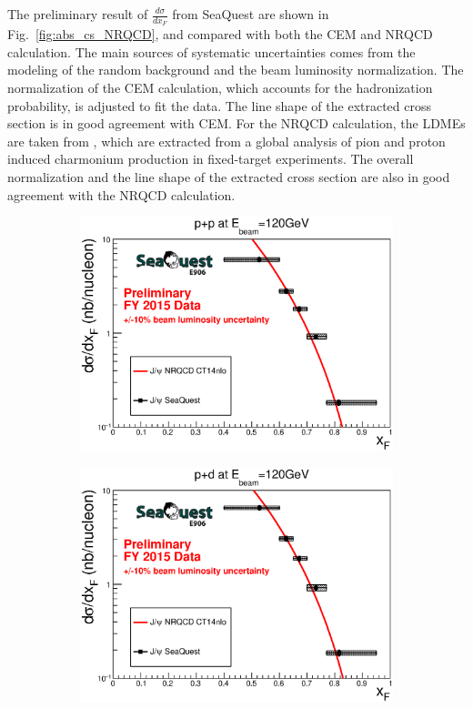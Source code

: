 \documentclass[10pt,a4paper,final]{article}
\begin{document}
The preliminary result of $\frac{d\sigma}{dx_F}$ from SeaQuest are shown in
Fig.~\ref{fig:abs_cs_NRQCD}, and compared with both the CEM and NRQCD calculation.
The main sources of systematic uncertainties comes from the modeling of the random background
and the beam luminosity normalization. The normalization of the CEM calculation,
which accounts for the hadronization probability, is adjusted to fit the data. The line
shape of the extracted cross section is in good agreement with CEM. For the NRQCD
calculation, the LDMEs are taken from \cite{hsieh2021}, which are extracted from
a global analysis of pion and proton induced charmonium production in fixed-target
experiments. The overall normalization and the line shape of the extracted cross
section are also in good agreement with the NRQCD calculation.
\begin{figure}[htbp!]
	\centering
	\begin{subfigure}{0.45\linewidth}
		\includegraphics[width=0.9\linewidth]{jpsi_xF_LH2}
	\end{subfigure}
	\begin{subfigure}{0.45\linewidth}
		\includegraphics[width=0.9\linewidth]{jpsi_xF_LD2}

\end{subfigure}
\end{figure}
\end{document}
